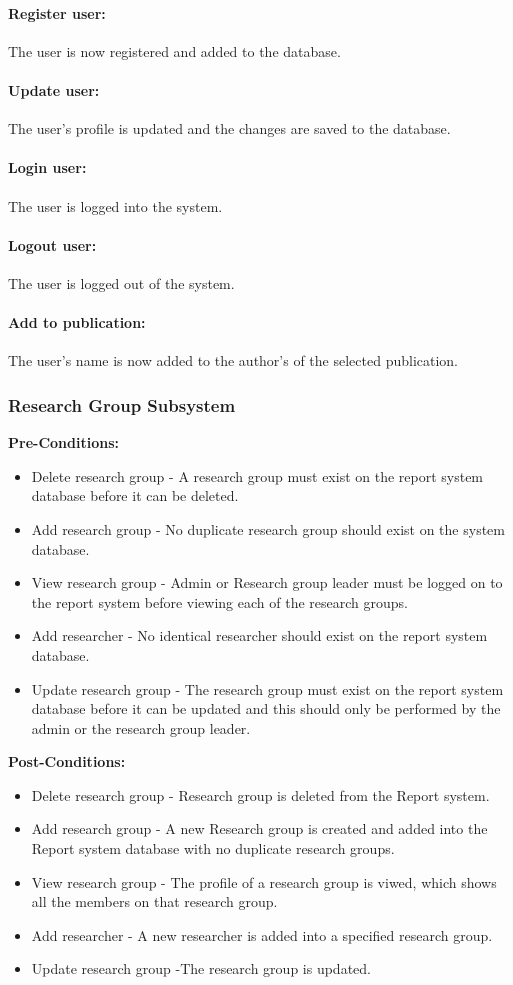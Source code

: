 \documentclass{article}
\begin{document}
			\paragraph{Register user:} The user is now registered and added to the database.
			\paragraph{Update user:} The user's profile is updated and the changes are saved to the database.
			\paragraph{Login user:} The user is logged into the system.
			\paragraph{Logout user:} The user is logged out of the system.
			\paragraph{Add to publication:} The user's name is now added to the author's of the selected publication.
		\subsubsection{Research Group Subsystem}
			\textbf{Pre-Conditions:}
			\begin{itemize}
				\item Delete research group - A research group must exist on the report system database before it can be deleted.
				\item Add research group - No duplicate research group should exist on the system database. 
				\item View research group - Admin or Research group leader must be logged on to the  report system before  viewing  each of the research groups.
				\item Add researcher - No identical researcher should exist on the report system database.
				\item Update research group - The research group must exist on the report system database before it can be 	updated and this should only be performed by the admin or the research group leader.
			\end{itemize}
			\textbf{Post-Conditions:}
			
			\begin{itemize}
				\item Delete research group - Research group is deleted from the  Report system. 
				\item Add research group - A new Research group is created and added into the Report system database with no 				duplicate
				research groups. 
				\item View research group - The profile of a research group is viwed, which shows all the members on that 					research group.
				\item Add researcher - A new researcher is added into a specified research group.
				\item Update research group -The research group is updated.
			\end{itemize}
\end{document}
